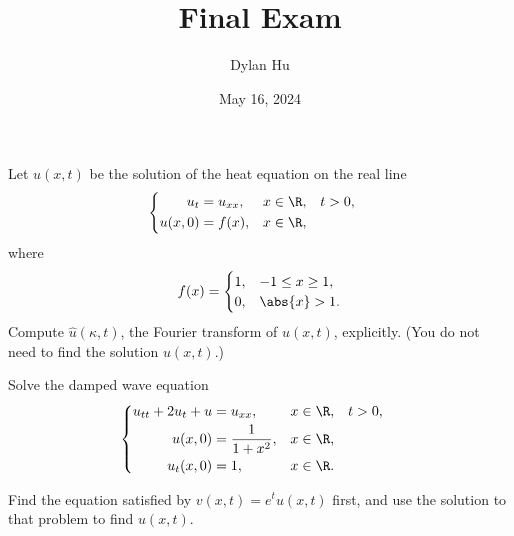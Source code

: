 \documentclass[plain]{pset}
\title{Final Exam}
\author{Dylan Hu}
\date{May 16, 2024}
\begin{document}
\maketitle

\pagebreak

\begin{problem}
Let \(u(x, t)\) be the solution of the heat equation on the real line
\[
    \begin{cases}
        \begin{aligned}
            u_t     & = u_{xx}, & x \in \R, &  & t > 0, \\
            u(x, 0) & = f(x),   & x \in \R,
        \end{aligned}
    \end{cases}
\]
where
\[
    f(x) = \begin{cases}
        1, & -1 \leq x \geq 1, \\
        0, & \abs{x} > 1.
    \end{cases}
\]
Compute \(\hat{u}(\kappa, t)\), the Fourier transform of \(u(x, t)\), explicitly. (You do not need to find the solution \(u(x, t)\).)
\end{problem}

\begin{solution}

\end{solution}

\pagebreak

\begin{problem}
Solve the damped wave equation
\[
    \begin{cases}
        \begin{aligned}
            u_{tt} + 2u_t + u & = u_{xx},            & x \in \R, &  & t > 0, \\
            u(x, 0)           & = \frac{1}{1 + x^2}, & x \in \R,             \\
            u_t(x, 0)         & = 1,                 & x \in \R.
        \end{aligned}
    \end{cases}
\]
\begin{hint}
    Find the equation satisfied by \(v(x, t) = e^t u(x, t)\) first, and use the solution to that problem to find \(u(x, t)\).
\end{hint}
\end{problem}

\begin{solution}
\end{solution}
\end{document}
